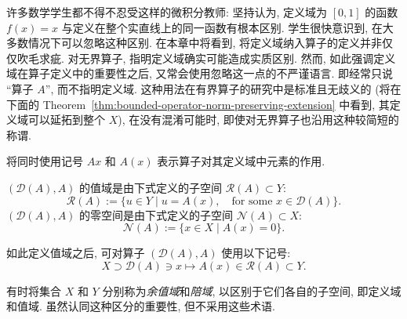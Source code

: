 许多数学学生都不得不忍受这样的微积分教师: 坚持认为, 定义域为 $[0,1]$ 的函数 $f(x)=x$ 与定义在整个实直线上的同一函数有根本区别. 学生很快意识到, 在大多数情况下可以忽略这种区别. 在本章中将看到, 将定义域纳入算子的定义并非仅仅吹毛求疵. 对无界算子, 指明定义域确实可能造成实质区别. 然而, 如此强调定义域在算子定义中的重要性之后, 又常会使用忽略这一点的不严谨语言. 即经常只说 ``算子 $A$'', 而不指明定义域. 这种用法在有界算子的研究中是标准且无歧义的 (将在下面的 Theorem~\ref{thm:bounded-operator-norm-preserving-extension} 中看到, 其定义域可以延拓到整个 $X$), 在没有混淆可能时, 即使对无界算子也沿用这种较简短的称谓.

将同时使用记号 $Ax$ 和 $A(x)$ 表示算子对其定义域中元素的作用.

\begin{Definition}
\label{def:operator-range-null-space}
$(\mathcal{D}(A),A)$ 的值域是由下式定义的子空间 $\mathcal{R}(A)\subset Y$:
\begin{equation}\label{eq:linear-operator-range-definition}
\mathcal{R}(A):=\{u\in Y\mid u=A(x),\quad\text{for some }x\in\mathcal{D}(A)\}.
\end{equation}
$(\mathcal{D}(A),A)$ 的零空间是由下式定义的子空间 $\mathcal{N}(A)\subset X$:
\begin{equation}\label{eq:linear-operator-null-space-definition}
\mathcal{N}(A):=\{x\in X\mid A(x)=0\}.
\end{equation}

\end{Definition}

如此定义值域之后, 可对算子 $(\mathcal{D}(A),A)$ 使用以下记号:\[X\supset\mathcal{D}(A)\ni x\mapsto A(x)\in\mathcal{R}(A)\subset Y.\]

有时将集合 $X$ 和 $Y$ 分别称为\emph{余值域}和\emph{陪域}, 以区别于它们各自的子空间, 即定义域和值域. 虽然认同这种区分的重要性, 但不采用这些术语.

